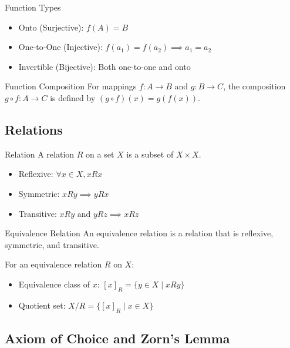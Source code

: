 \documentclass[12pt,a4paper]{article}
\begin{document}
\begin{definitionbox}{Function Types}
\begin{itemize}
    \item Onto (Surjective): $f(A) = B$
    \item One-to-One (Injective): $f(a_1) = f(a_2) \implies a_1 = a_2$
    \item Invertible (Bijective): Both one-to-one and onto
\end{itemize}
\end{definitionbox}

\begin{definitionbox}{Function Composition}
For mappings $f: A \to B$ and $g: B \to C$, the composition $g \circ f: A \to C$ is defined by $(g \circ f)(x) = g(f(x))$.
\end{definitionbox}

\subsection{Relations}

\begin{definitionbox}{Relation}
A relation $R$ on a set $X$ is a subset of $X \times X$. 
\begin{itemize}
    \item Reflexive: $\forall x \in X, xRx$
    \item Symmetric: $x R y \implies y R x$
    \item Transitive: $x R y \text{ and } y R z \implies x R z$
\end{itemize}
\end{definitionbox}

\begin{definitionbox}{Equivalence Relation}
An equivalence relation is a relation that is reflexive, symmetric, and transitive.

For an equivalence relation $R$ on $X$:
\begin{itemize}
    \item Equivalence class of $x$: $[x]_R = \{y \in X \mid xRy\}$
    \item Quotient set: $X/R = \{[x]_R \mid x \in X\}$
\end{itemize}
\end{definitionbox}

\subsection{Axiom of Choice and Zorn's Lemma}
\end{document}
